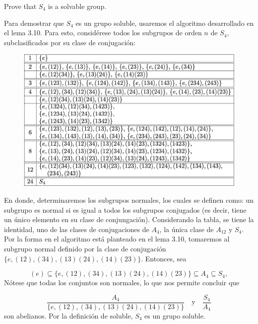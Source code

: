 \begin{problema}[Problema 3]
    Prove that $S_4$ is a solvable group.
    \begin{dem}
        Para demostrar que $S_4$ es un grupo soluble, usaremos el algoritmo desarrollado en el lema 3.10. Para esto, considérese todos los subgrupos de orden $n$ de $S_4$, subclasificados por su clase de conjugación: 
        \begin{figure}[H]
            \centering
            \includegraphics[scale=0.5]{Problemas/1.png}
        \end{figure}

        En donde, determinaremos los subgrupos normales, los cuales se definen como: un subgrupo es normal si es igual a todos los subgrupos conjugados (es decir, tiene un único elemento en su clase de conjungación). Considerando la tabla, se tiene la identidad, uno de las clases de conjugaciones de $A_4$, la única clase de $A_{12}$ y $S_4$. Por la forma en el algoritmo está planteado en el lema 3.10, tomaremos al subgrupo normal definido por la clase de conjugación $\{e,(12),(34),(13)(24),(14)(23)\}$. Entonces, sea 

        $$(e)\subseteq \{e,(12),(34),(13)(24),(14)(23)\}\subseteq A_4\subseteq S_4,$$
        Nótese que todas los conjuntos son normales, lo que nos permite concluir que 


        $$\frac{A_4}{\{e,(12),(34),(13)(24),(14)(23)\}}\quad\text{y}\quad \frac{S_4}{A_4}$$
        son abelianos. Por la definición de soluble, $S_4$ es un grupo soluble.

    \end{dem}
\end{problema}

